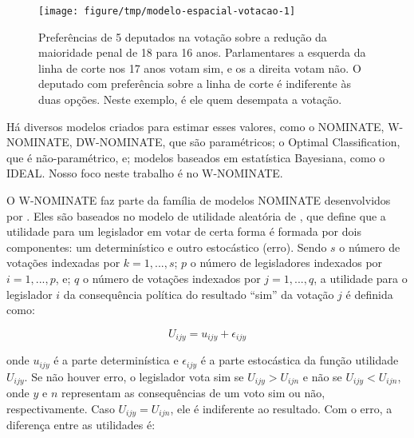 \documentclass[a4paper,titlepage]{ppgi}\usepackage[]{graphicx}\usepackage[]{color}
\newenvironment{knitrout}{}{} %
\begin{document}
\begin{knitrout}
\color{fgcolor}\begin{figure}
\texttt{[image: figure/tmp/modelo-espacial-votacao-1]} \caption[Preferências de 5 deputados na votação sobre a redução da maioridade penal de 18 para 16 anos]{Preferências de 5 deputados na votação sobre a redução da maioridade penal de 18 para 16 anos.  Parlamentares a esquerda da linha de corte nos 17 anos votam sim, e os a direita votam não. O deputado com preferência sobre a linha de corte é indiferente às duas opções. Neste exemplo, é ele quem desempata a votação.}\label{fig:modelo-espacial-votacao}
\end{figure}


\end{knitrout}

Há diversos modelos criados para estimar esses valores, como o NOMINATE,
W-NOMINATE, DW-NOMINATE, que são paramétricos; o Optimal Classification, que é
não-paramétrico, e; modelos baseados em estatística Bayesiana, como o IDEAL.
Nosso foco neste trabalho é no W-NOMINATE.
\cite{Poole1985,Poole2000,Poole2005,Jackman2000,Clinton2004}

O W-NOMINATE faz parte da família de modelos NOMINATE desenvolvidos por
. Eles são baseados no modelo de utilidade aleatória de
, que define que a utilidade para um legislador em
votar de certa forma é formada por dois componentes: um determinístico e outro
estocástico (erro). Sendo $s$ o número de votações indexadas por $k = 1, ...,
s$; $p$ o número de legisladores indexados por $i = 1, ..., p$, e; $q$ o número
de votações indexados por $j = 1, ..., q$, a utilidade para o legislador $i$ da
consequência política do resultado ``sim'' da votação $j$ é definida como:

\begin{equation}
\label{eq:random-utility}
 U_{ijy} = u_{ijy} + \epsilon_{ijy}
\end{equation}

onde $u_{ijy}$ é a parte determinística e $\epsilon_{ijy}$ é a parte
estocástica da função utilidade $U_{ijy}$. Se não houver erro, o legislador vota sim se
$U_{ijy} > U_{ijn}$ e não se $U_{ijy} < U_{ijn}$, onde $y$ e $n$ representam as
consequências de um voto sim ou não, respectivamente. Caso $U_{ijy} = U_{ijn}$,
ele é indiferente ao resultado. Com o erro, a diferença entre as utilidades é:
\end{document}
